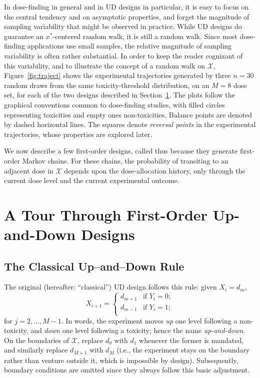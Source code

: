 In dose-finding in general and in UD designs in particular, it is easy to focus on the central tendency and on asymptotic properties, and forget the magnitude of sampling variability that might be observed in practice. While UD designs do guarantee an $x^*$-centered random walk, it is still a random walk. Since most dose-finding applications use small samples, the relative magnitude of sampling variability is often rather substantial. In order to keep the reader cognizant of this variability, and to illustrate the concept of a random walk on $\mathcal{X}$, Figure~\ref{fig:traject} shows the experimental trajectories generated by three $n=30$ random draws from the same toxicity-threshold distribution, on an $M=8$ dose set, for each of the two designs described in Section~\ref{sec:tour}. The plots follow the graphical conventions common to dose-finding studies, with filled circles representing toxicities and empty ones non-toxicities. Balance points are denoted by dashed horizontal lines. The squares denote \emph{reversal points} in the experimental trajectories, whose properties are explored later.

We now describe a few first-order designs, called thus because they generate first-order Markov chains. For these chains, the probability of transiting to an adjacent dose in $\mathcal{X}$ depends upon the dose-allocation history, only through the current dose level and the current experimental outcome.

\section{A Tour Through First-Order Up-and-Down Designs}\label{sec:tour}
\subsection{The Classical Up--and--Down Rule}

The original (hereafter: ``classical'') UD design follows this rule: given $X_i=d_m$,
\begin{equation*}
X_{i+1}=
\begin{cases}
d_{m+1} &\textrm{if $Y_i=0$};\\
d_{m-1} &\textrm{if $Y_i=1$};\\
\end{cases}
\end{equation*}
for $j=2,\ldots,M-1$. In words, the experiment moves \emph{up} one level following a non-toxicity, and \emph{down} one level following a toxicity; hence the name \emph{up-and-down}. On the boundaries of $\mathcal{X}$, replace $d_0$ with $d_1$ whenever the former is mandated, and similarly replace $d_{M+1}$ with $d_M$ (i.e., the experiment stays on the boundary rather than venture outside it, which is impossible by design). Subsequently, boundary conditions are omitted since they always follow this basic adjustment.

